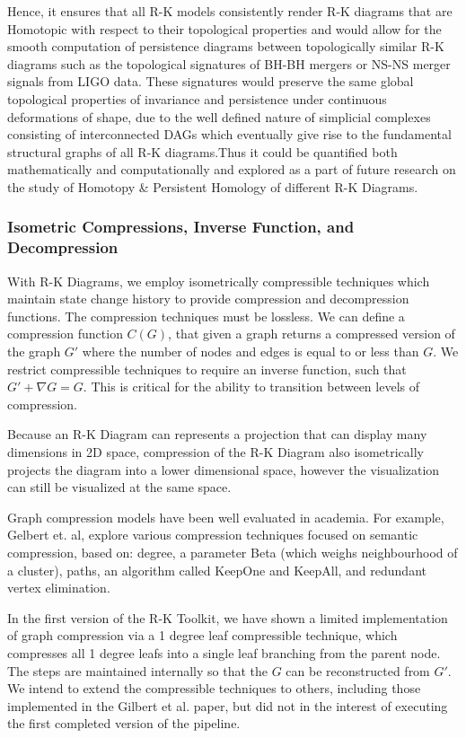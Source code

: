 Hence, it ensures that all R-K models consistently render R-K diagrams that are Homotopic with respect to their topological properties and would allow for the smooth computation of persistence diagrams between topologically similar R-K diagrams such as the topological signatures of  BH-BH mergers or NS-NS merger signals from LIGO data. These signatures would preserve the same global topological properties of invariance and persistence under continuous deformations of shape, due to the well defined nature of simplicial complexes consisting of interconnected DAGs which eventually give rise to the fundamental structural graphs of all R-K diagrams.Thus it could be quantified both mathematically and computationally and explored as a part of future research on the study of Homotopy \&  Persistent Homology of different R-K Diagrams.

\subsubsection{Isometric Compressions, Inverse Function, and Decompression}
\label{subsec:compression}

With R-K Diagrams, we employ isometrically compressible techniques which maintain state change history to provide compression and decompression functions. The compression techniques must be lossless. We can define a compression function $C(G)$, that given a graph returns a compressed version of the graph $G\prime$ where the number of nodes and edges is equal to or less than $G$. We restrict compressible techniques to require an inverse function, such that $G\prime + \nabla{G} = G$. This is critical for the ability to transition between levels of compression.

Because an R-K Diagram can represents a projection that can display many dimensions in 2D space, compression of the R-K Diagram also isometrically projects the diagram into a lower dimensional space, however the visualization can still be visualized at the same space.

Graph compression models have been well evaluated in academia. For example, Gelbert et. al, \cite{gilbert_levchenko} explore various compression techniques focused on semantic compression, based on: degree, a parameter Beta (which weighs neighbourhood of a cluster), paths, an algorithm called KeepOne and KeepAll, and redundant vertex elimination. \cite{gilbert_levchenko}

In the first version of the R-K Toolkit, we have shown a limited implementation of graph compression via a 1 degree leaf compressible technique, which compresses all 1 degree leafs into a single leaf branching from the parent node. The steps are maintained internally so that the $G$ can be reconstructed from $G\prime$. We intend to extend the compressible techniques to others, including those implemented in the Gilbert et al. paper, but did not in the interest of executing the first completed version of the pipeline.

